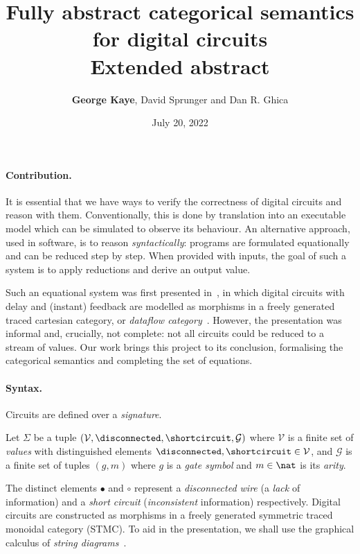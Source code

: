 \documentclass[10pt]{article}
\title{\vspace{-3em}Fully abstract categorical semantics for digital circuits\\\textbf{Extended abstract}}
\author{\textbf{George Kaye}, David Sprunger and Dan R. Ghica}
\date{July 20, 2022}
\begin{document}
    \maketitle

    \paragraph*{Contribution.}
    It is essential that we have ways to verify the correctness of digital circuits and reason with them.
    Conventionally, this is done by translation into an executable model which can be simulated to observe its behaviour.
    An alternative approach, used in software, is to reason \emph{syntactically}: programs are formulated equationally and can be reduced step by step.
    When provided with inputs, the goal of such a system is to apply reductions and derive an output value.

    Such an equational system was first presented in~\cite{ghica2016categorical,ghica2017diagrammatic}, in which digital circuits with delay and (instant) feedback are modelled as morphisms in a freely generated traced cartesian category, or \emph{dataflow category}~\cite{cazanescu1994feedback,hasegawa1997recursion}.
    However, the presentation was informal and, crucially, not complete: not all circuits could be reduced to a stream of values.
    Our work brings this project to its conclusion, formalising the categorical semantics and completing the set of equations.

    \paragraph*{Syntax.}
    Circuits are defined over a \emph{signature}.

    \begin{definition}
        Let \(\Sigma\) be a tuple \((\mathcal{V},\disconnected,\shortcircuit,\mathcal{G})\) where \(\mathcal{V}\) is a finite set of \emph{values} with distinguished elements \(\disconnected,\shortcircuit \in \mathcal{V}\), and \(\mathcal{G}\) is a finite set of tuples \((g,m)\) where \(g\) is a \emph{gate symbol} and \(m \in \nat\) is its \emph{arity}.
    \end{definition}

    \noindent
    The distinct elements \(\bullet\) and \(\circ\) represent a \emph{disconnected wire} (a \emph{lack} of information) and a \emph{short circuit} (\emph{inconsistent} information) respectively.
    Digital circuits are constructed as morphisms in a freely generated symmetric traced monoidal category (STMC).
    To aid in the presentation, we shall use the graphical calculus of \emph{string diagrams}~\cite{joyal1991geometry,joyal1996traced,selinger2011survey}.
\end{document}
